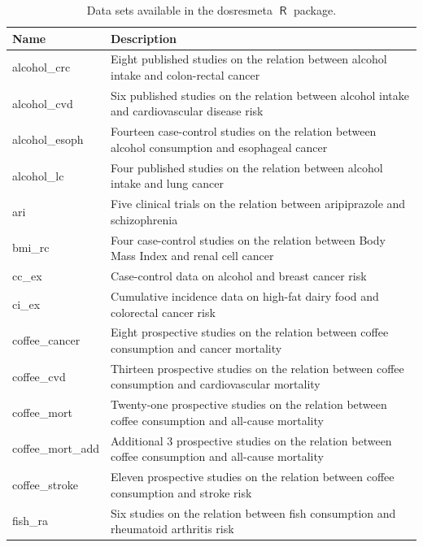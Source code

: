 \documentclass[11pt,a4paper,twoside,openany]{book}\usepackage{knitr}
\newcommand{\pkg}[1]{{\fontseries{b}\selectfont #1}}
\DeclareMathOperator{\R}{\textsf{R}}
\begin{document}
{{\begin{knitrout}
\begin{table}
\caption{\label{tab:data_table}Data sets available in the \pkg{dosresmeta} $\R$ package.}
\centering
\begin{tabular}[t]{l>{\raggedright\arraybackslash}p{32em}}
\toprule
Name & Description\\
\midrule
alcohol\_crc & Eight published studies on the relation between alcohol intake and colon-rectal cancer \citep{orsini2011meta}\\
alcohol\_cvd & Six published studies on the relation between alcohol intake and cardiovascular disease risk \citep{liu2009two}\\
alcohol\_esoph & Fourteen case-control studies on the relation between alcohol consumption and esophageal cancer \citep{rota2010random}\\
alcohol\_lc & Four published studies on the relation between alcohol intake and lung cancer \citep{orsini2011meta}\\
ari & Five clinical trials on the relation between aripiprazole and schizophrenia \citep{crippa2016dose}\\
\addlinespace
bmi\_rc & Four case-control studies on the relation between Body Mass Index and renal cell cancer \citep{liu2009two}\\
cc\_ex & Case-control data on alcohol and breast cancer risk \citep{greenland1992methods}\\
ci\_ex & Cumulative incidence data on high-fat dairy food and colorectal cancer risk \citep{orsini2006generalized}\\
coffee\_cancer & Eight prospective studies on the relation between coffee consumption and cancer mortality \citep{crippa2014coffee}\\
coffee\_cvd & Thirteen prospective studies on the relation between coffee consumption and cardiovascular mortality \citep{crippa2014coffee}\\
\addlinespace
coffee\_mort & Twenty-one prospective studies on the relation between coffee consumption and all-cause mortality \citep{crippa2014coffee}\\
coffee\_mort\_add & Additional 3 prospective studies on the relation between coffee consumption and all-cause mortality \citep{nilsson2012traditional}\\
coffee\_stroke & Eleven prospective studies on the relation between coffee consumption and stroke risk \citep{larsson2011coffee}\\
fish\_ra & Six studies on the relation between fish consumption and rheumatoid arthritis risk \citep{di2014fish}\\

\end{tabular}
\end{table}
\end{knitrout}}}
\end{document}
